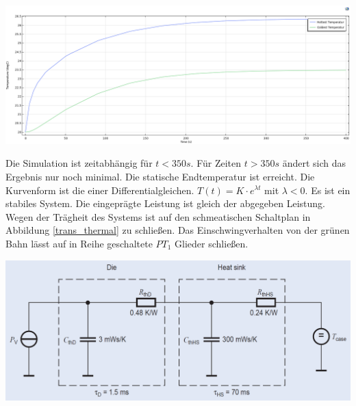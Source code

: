 \documentclass[10pt,a4paper,oneside,abstracton]{scrartcl}
\newenvironment{Figure}
  {\par\medskip\noindent\minipage{\linewidth}}
  {\endminipage\par\medskip}
\begin{document}
\begin{multicols}{2}
\begin{Figure}
	\includegraphics[width=\textwidth]{Bilder/time_dep.png}
	\label{timedep}
\end{Figure}
\noindent
Die Simulation ist zeitabhängig für $ t < 350s $. 
Für Zeiten $ t > 350s $ ändert sich das Ergebnis nur noch minimal. 
Die statische Endtemperatur ist erreicht. 
Die Kurvenform ist die einer Differentialgleichen. $ T(t) = K \cdot e^{\lambda t} $ mit
$ \lambda  < 0$. Es ist ein stabiles System. 
Die eingeprägte Leistung ist gleich der abgegeben Leistung. 
Wegen der Trägheit des Systems ist auf den schmeatischen Schaltplan in Abbildung \ref{trans_thermal} zu schließen. 
Das Einschwingverhalten von der grünen Bahn lässt auf in Reihe geschaltete $PT_1$ Glieder schließen. 
\begin{Figure}
	\includegraphics[width=\textwidth]{Bilder/trans_thermal.png}
	\label{trans_thermal}
\end{Figure}


\end{multicols}
\end{document}
